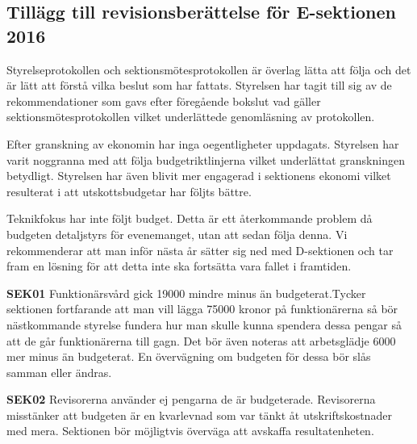 \documentclass[../_main/handlingar.tex]{subfiles}
\begin{document}
\subsection{Tillägg till revisionsberättelse för E-sektionen 2016}

Styrelseprotokollen och sektionsmötesprotokollen är överlag lätta att följa och det är lätt att förstå vilka beslut som har fattats. Styrelsen har tagit till sig av de rekommendationer som gavs efter föregående bokslut vad gäller sektionsmötesprotokollen vilket underlättede genomläsning av protokollen.

Efter granskning av ekonomin har inga oegentligheter uppdagats. Styrelsen har varit noggranna med att följa budgetriktlinjerna vilket underlättat granskningen betydligt. Styrelsen har även blivit mer engagerad i sektionens ekonomi vilket resulterat i att utskottsbudgetar har följts bättre.

Teknikfokus har inte följt budget. Detta är ett återkommande problem då budgeten detaljstyrs för
evenemanget, utan att sedan följa denna. Vi rekommenderar att man inför nästa år sätter sig ned
med D-sektionen och tar fram en lösning för att detta inte ska fortsätta vara fallet i framtiden.

\textbf{SEK01} Funktionärsvård gick 19000 mindre minus än budgeterat.Tycker sektionen
fortfarande att man vill lägga 75000 kronor på funktionärerna så bör nästkommande styrelse fundera hur man skulle kunna spendera dessa pengar så att de går funktionärerna till gagn. Det bör även noteras att arbetsglädje 6000 mer minus än budgeterat. En övervägning om budgeten för dessa bör slås samman eller ändras.

\textbf{SEK02} Revisorerna använder ej pengarna de är budgeterade. Revisorerna misstänker att budgeten är en kvarlevnad som var tänkt åt utskriftskostnader med mera. Sektionen bör möjligtvis överväga att avskaffa resultatenheten.
\end{document}
